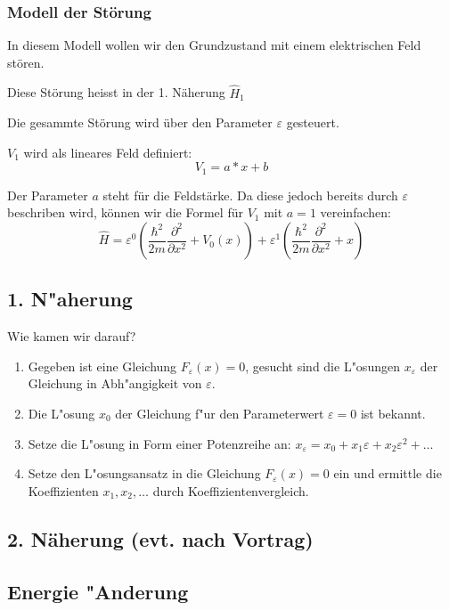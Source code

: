\begin{refsection}
\subsubsection{ Modell der St\"orung }
In diesem Modell wollen wir den Grundzustand mit einem elektrischen Feld st\"oren.

Diese St\"orung heisst in der 1. N\"aherung $\hat H_1$

Die gesammte St\"orung wird \"uber den Parameter $\varepsilon$ gesteuert.

$V_1$ wird als lineares Feld definiert:
\[
  V_1 = a*x + b
\]

Der Parameter $a$ steht f\"ur die Feldst\"arke. Da diese jedoch bereits durch 
$\varepsilon$ beschriben wird, k\"onnen wir die Formel f\"ur $V_1$ mit $a = 1$ vereinfachen:
\[
  \hat{H} = \varepsilon^0 ( \frac{\hbar^2}{2m} \frac{\partial^2}{\partial x^2} + V_0(x) )
            + \varepsilon^1 ( \frac{\hbar^2}{2m} \frac{\partial^2}{\partial x^2} + x )
\]


\subsection{ 1. N"aherung }

Wie kamen wir darauf?

\begin{enumerate}
\item Gegeben ist eine Gleichung $F_\varepsilon(x)=0$, gesucht
sind die L"osungen $x_\varepsilon$ der Gleichung in Abh"angigkeit von
$\varepsilon$.
\item Die L"osung $x_0$ der Gleichung f"ur den Parameterwert $\varepsilon=0$
ist bekannt.
\item Setze die L"osung in Form einer Potenzreihe an:
$x_\varepsilon = x_0+x_1\varepsilon+x_2\varepsilon^2+\dots$
\item Setze den L"osungsansatz in die Gleichung $F_\varepsilon(x)=0$ ein
und ermittle die Koeffizienten $x_1,x_2,\dots$ durch Koeffizientenvergleich.
\end{enumerate}

\subsection{ 2. N\"aherung (evt. nach Vortrag) }

\subsection{ Energie "Anderung }


\end{refsection}
